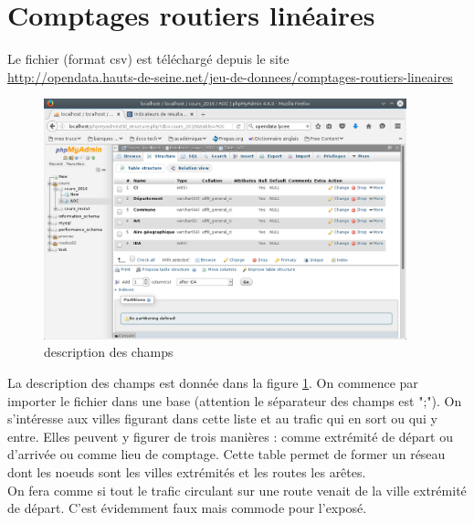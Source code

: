 


\section{Comptages routiers linéaires}
Le fichier (format csv) est téléchargé depuis le site\\ \href{http://opendata.hauts-de-seine.net/jeu-de-donnees/comptages-routiers-lineaires}{http://opendata.hauts-de-seine.net/jeu-de-donnees/comptages-routiers-lineaires}\\
\begin{figure}[h]
  \centering
  \includegraphics[width=10.5cm]{./projbdd_1.fig.png}
  \caption{description des champs}
  \label{fig:projbdd_1}
\end{figure}
La description des champs est donnée dans la figure \ref{fig:projbdd_1}. On commence par importer le fichier dans une base (attention le séparateur des champs est ";").
On s'intéresse aux villes figurant dans cette liste et au trafic qui en sort ou qui y entre. Elles peuvent y figurer de trois manières : comme extrémité de départ ou d'arrivée ou comme lieu de comptage. Cette table permet de former un réseau dont les noeuds sont les villes extrémités et les routes les arêtes.\\
On fera comme si tout le trafic circulant sur une route venait de la ville extrémité de départ. C'est évidemment faux mais commode pour l'exposé.
